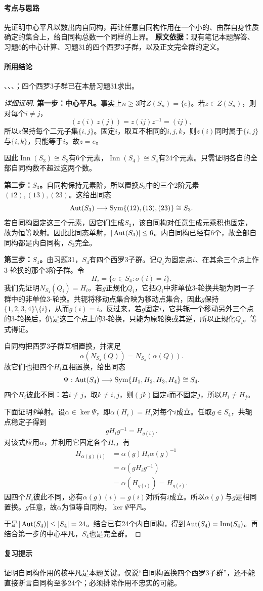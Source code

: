 \paragraph{考点与思路}先证明中心平凡以数出内自同构，再让任意自同构作用在一个小的、由群自身性质确定的集合上，给自同构总数一个同样的上界。
\textbf{原文依据：}现有笔记本题解答、习题6的中心计算、习题31的四个西罗3子群，以及正文完全群的定义。
\paragraph{所用结论}、、、；四个西罗3子群已在本册习题31求出。
\begin{proof}[详细证明]
\textbf{第一步：中心平凡。}事实上$n\ge3$时$Z(S_n)=\{e\}$。若$z\in Z(S_n)$，则对每个$i\ne j$，
\[
(z(i)\ z(j))=z(ij)z^{-1}=(ij),
\]
所以$z$保持每个二元子集$\{i,j\}$。固定$i$，取互不相同的$i,j,k$，则$z(i)$同时属于$\{i,j\}$与$\{i,k\}$，只能等于$i$。故$z=e$。

因此$\operatorname{Inn}(S_3)\cong S_3$有6个元素，$\operatorname{Inn}(S_4)\cong S_4$有24个元素。只需证明各自的全部自同构数不超过这两个数。

\textbf{第二步：$S_3$。}自同构保持元素阶，所以置换$S_3$中的三个2阶元素$(12),(13),(23)$。这给出同态
\[
\operatorname{Aut}(S_3)\longrightarrow\operatorname{Sym}\{(12),(13),(23)\}\cong S_3.
\]
若自同构固定这三个元素，因它们生成$S_3$，该自同构对任意生成元乘积也固定，故为恒等映射。因此此同态单射，$|\operatorname{Aut}(S_3)|\le6$。内自同构已经有6个，故全部自同构都是内自同构，$S_3$完全。

\textbf{第三步：$S_4$。}由习题31，$S_4$有四个西罗3子群。记$Q_i$为固定点$i$、在其余三个点上作3-轮换的那个3阶子群。令
\[
H_i=\{\sigma\in S_4:\sigma(i)=i\}.
\]
我们先证明$N_{S_4}(Q_i)=H_i$。若$g$正规化$Q_i$，它把$Q_i$中非单位3-轮换共轭为同一子群中的非单位3-轮换。共轭将移动点集合映为移动点集合，因此$g$保持$\{1,2,3,4\}\setminus\{i\}$，从而$g(i)=i$。反过来，若$g$固定$i$，它共轭一个移动另外三个点的3-轮换后，仍是这三个点上的3-轮换，只能为原轮换或其逆，所以正规化$Q_i$。等式得证。

自同构把西罗3子群互相置换，并满足
\[
\alpha(N_{S_4}(Q))=N_{S_4}(\alpha(Q)).
\]
故它们也把四个$H_i$互相置换，给出同态
\[
\Psi:\operatorname{Aut}(S_4)\longrightarrow\operatorname{Sym}\{H_1,H_2,H_3,H_4\}\cong S_4.
\]
四个$H_i$彼此不同：若$i\ne j$，取$k\ne i,j$，则$(jk)$固定$i$而不固定$j$，所以$H_i\ne H_j$。

下面证明$\Psi$单射。设$\alpha\in\ker\Psi$，即$\alpha(H_i)=H_i$对每个$i$成立。任取$g\in S_4$，共轭点稳定子得到
\[
gH_ig^{-1}=H_{g(i)}.
\]
对该式应用$\alpha$，并利用它固定各个$H_i$，有
\begin{align*}
H_{\alpha(g)(i)}
&=\alpha(g)H_i\alpha(g)^{-1}\\
&=\alpha(gH_ig^{-1})\\
&=\alpha(H_{g(i)})=H_{g(i)}.
\end{align*}
因四个$H_i$彼此不同，必有$\alpha(g)(i)=g(i)$对所有$i$成立。所以$\alpha(g)$与$g$是相同置换。$g$任意，故$\alpha$为恒等自同构，$\ker\Psi$平凡。

于是$|\operatorname{Aut}(S_4)|\le|S_4|=24$。结合已有24个内自同构，得到$\operatorname{Aut}(S_4)=\operatorname{Inn}(S_4)$。再结合第一步的中心平凡，$S_4$也是完全群。
\end{proof}
\paragraph{复习提示}证明自同构作用的核平凡是本题关键。仅说“自同构置换四个西罗3子群”，还不能直接断言自同构至多24个；必须排除作用不忠实的可能。
